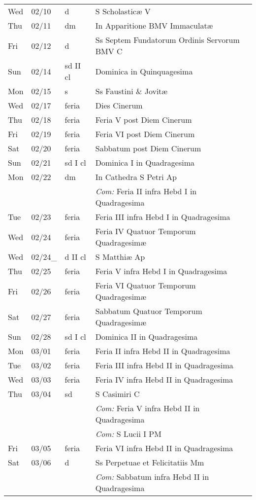 \documentclass[10pt]{article}
\begin{document}
\begin{longtable}{ l l l l }
Wed & 02/10 & d & S Scholasticæ V\\
Thu & 02/11 & dm & In Apparitione BMV Immaculatæ\\
Fri & 02/12 & d & Ss Septem Fundatorum Ordinis Servorum BMV C\\
Sun & 02/14 & sd II cl & Dominica in Quinquagesima\\
Mon & 02/15 & s & Ss Faustini \& Jovitæ\\
Wed & 02/17 & feria & Dies Cinerum\\
Thu & 02/18 & feria & Feria V post Diem Cinerum\\
Fri & 02/19 & feria & Feria VI post Diem Cinerum\\
Sat & 02/20 & feria & Sabbatum post Diem Cinerum\\
Sun & 02/21 & sd I cl & Dominica I in Quadragesima\\
Mon & 02/22 & dm & In Cathedra S Petri Ap\\
 & & & \textit{Com:} Feria II infra Hebd I in Quadragesima\\
Tue & 02/23 & feria & Feria III infra Hebd I in Quadragesima\\
Wed & 02/24 & feria & Feria IV Quatuor Temporum Quadragesimæ\\
Wed & 02/24\_ & d II cl & S Matthiæ Ap\\
Thu & 02/25 & feria & Feria V infra Hebd I in Quadragesima\\
Fri & 02/26 & feria & Feria VI Quatuor Temporum Quadragesimæ\\
Sat & 02/27 & feria & Sabbatum Quatuor Temporum Quadragesimæ\\
Sun & 02/28 & sd I cl & Dominica II in Quadragesima\\
Mon & 03/01 & feria & Feria II infra Hebd II in Quadragesima\\
Tue & 03/02 & feria & Feria III infra Hebd II in Quadragesima\\
Wed & 03/03 & feria & Feria IV infra Hebd II in Quadragesima\\
Thu & 03/04 & sd & S Casimiri C\\
 & & & \textit{Com:} Feria V infra Hebd II in Quadragesima\\
 & & & \textit{Com:} S Lucii I PM\\
Fri & 03/05 & feria & Feria VI infra Hebd II in Quadragesima\\
Sat & 03/06 & d & Ss Perpetuae et Felicitatiis Mm\\
 & & & \textit{Com:} Sabbatum infra Hebd II in Quadragesima\\

\end{longtable}
\end{document}
